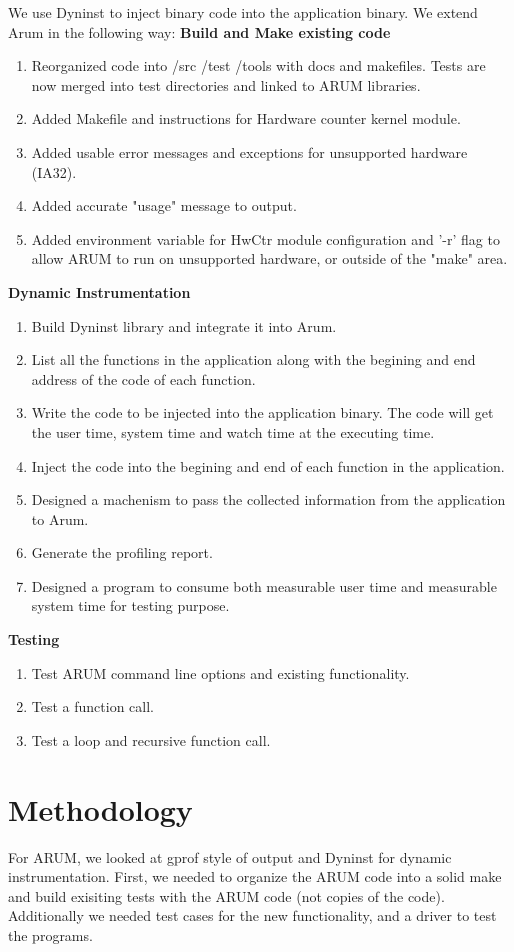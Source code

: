 \documentclass[11pt,letterpaper,oneside]{article}
\begin{document}
We use Dyninst to inject binary code into the application binary. We extend Arum in the following way:
\newline
\textbf{Build and Make existing code}
\begin{enumerate}
\item Reorganized code into /src /test /tools with docs and makefiles.  Tests are now merged into test directories and linked to ARUM libraries.
\item Added Makefile and instructions for Hardware counter kernel module.
\item Added usable error messages and exceptions for unsupported hardware (IA32).
\item Added accurate "usage" message to output.
\item Added environment variable for HwCtr module configuration and '-r' flag to allow ARUM to run on unsupported hardware, or outside of the "make" area.
\end{enumerate}
\textbf{Dynamic Instrumentation}
\begin{enumerate}
\item Build Dyninst library and integrate it into Arum.
\item List all the functions in the application along with the begining and end address of the code of each function.
\item Write the code to be injected into the application binary. The code will get the user time, system time and watch time at the executing time.
\item Inject the code into the begining and end of each function in the application.
\item Designed a machenism to pass the collected information from the application to Arum.
\item Generate the profiling report.
\item Designed a program to consume both measurable user time and measurable system time for testing purpose.
\end{enumerate}
\textbf{Testing}
\begin{enumerate}
\item Test ARUM command line options and existing functionality.
\item Test a function call.
\item Test a loop and recursive function call.
\end{enumerate}

\section{Methodology}
\label{sec:methodology}
For ARUM, we looked at gprof style of output and Dyninst for dynamic instrumentation.  First, we needed to organize the ARUM code into a solid make and build exisiting tests with the ARUM code (not copies of the code).   Additionally we needed test cases for the new functionality, and a driver to test the programs.
\end{document}
